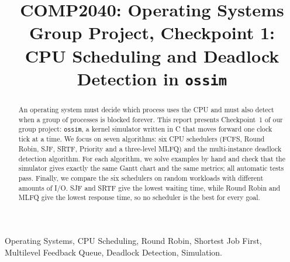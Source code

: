 \documentclass[conference]{IEEEtran}
\newcommand{\ossim}{\texttt{ossim}}
\begin{document}
\title{COMP2040: Operating Systems \\ Group Project, Checkpoint 1: \\ CPU Scheduling and Deadlock Detection in \ossim}

\author{
    \and
    \and
}

\maketitle

\begin{abstract}
An operating system must decide which process uses the CPU and must also detect when a group of processes is blocked forever. This report presents Checkpoint~1 of our group project: \ossim, a kernel simulator written in C that moves forward one clock tick at a time. We focus on seven algorithms: six CPU schedulers (FCFS, Round Robin, SJF, SRTF, Priority and a three-level MLFQ) and the multi-instance deadlock detection algorithm. For each algorithm, we solve examples by hand and check that the simulator gives exactly the same Gantt chart and the same metrics; all automatic tests pass. Finally, we compare the six schedulers on random workloads with different amounts of I/O. SJF and SRTF give the lowest waiting time, while Round Robin and MLFQ give the lowest response time, so no scheduler is the best for every goal.
\end{abstract}

\begin{IEEEkeywords}
Operating Systems, CPU Scheduling, Round Robin, Shortest Job First, Multilevel Feedback Queue, Deadlock Detection, Simulation.
\end{IEEEkeywords}
\end{document}
